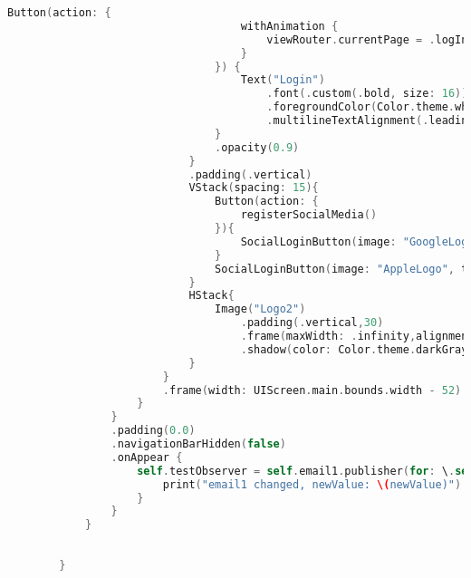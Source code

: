 \begin{minipage}{\textwidth}
\begin{lstlisting}[language=swift]
                                Button(action: {
                                    withAnimation {
                                        viewRouter.currentPage = .logInPage
                                    }
                                }) {
                                    Text("Login")
                                        .font(.custom(.bold, size: 16))
                                        .foregroundColor(Color.theme.white)
                                        .multilineTextAlignment(.leading)
                                }
                                .opacity(0.9)
                            }
                            .padding(.vertical)
                            VStack(spacing: 15){
                                Button(action: {
                                    registerSocialMedia()
                                }){
                                    SocialLoginButton(image: "GoogleLogo", text: "Sign in with Google")
                                }
                                SocialLoginButton(image: "AppleLogo", text: "Sing in with AppleID")
                            }
                            HStack{
                                Image("Logo2")
                                    .padding(.vertical,30)
                                    .frame(maxWidth: .infinity,alignment: .center)
                                    .shadow(color: Color.theme.darkGray.opacity(0.25), radius: 5, x: 0, y: 4)
                            }
                        }
                        .frame(width: UIScreen.main.bounds.width - 52)
                    }
                }
                .padding(0.0)
                .navigationBarHidden(false)
                .onAppear {
                    self.testObserver = self.email1.publisher(for: \.self).sink { newValue in
                        print("email1 changed, newValue: \(newValue)")
                    }
                }
            }
            
            
        }
    \end{lstlisting}   
\end{minipage}


